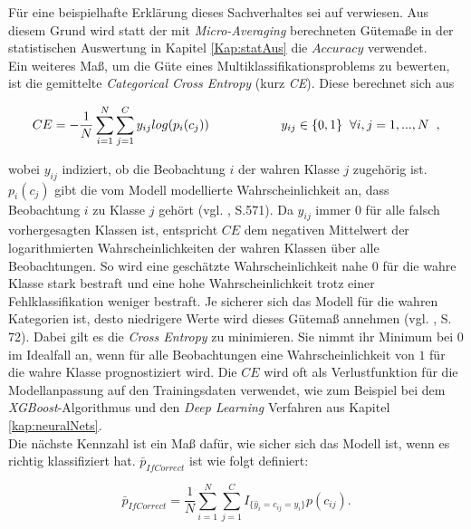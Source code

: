 \documentclass[a4paper,11pt]{article}
\begin{document}
Für eine beispielhafte Erklärung dieses Sachverhaltes sei auf \cite{towards1}
verwiesen. Aus diesem Grund wird statt der mit \textit{Micro-Averaging} berechneten Gütemaße in der statistischen Auswertung in Kapitel \ref{Kap:statAus} die $Accuracy$ verwendet.\\

Ein weiteres Maß, um die Güte eines Multiklassifikationsproblems zu bewerten, ist die gemittelte \textit{Categorical Cross Entropy} (kurz \textit{CE}). Diese berechnet sich aus

\[ CE = - \frac{1}{N}\sum_{i=1}^N \sum_{j = 1}^C y_{ij} log(p_i(c_j)) \hspace{2cm} y_{ij} \in \{0,1\} \hspace{0.2cm} \forall i, j = 1,...,N \hspace{0.2cm} ,\]

wobei $y_{ij}$ indiziert, ob die Beobachtung $i$ der wahren Klasse $j$ zugehörig ist. $p_i(c_j)$ gibt die vom Modell modellierte Wahrscheinlichkeit an, dass Beobachtung $i$ zu Klasse $j$ gehört (vgl. \cite{murphy}, S.571). Da $y_{ij}$ immer $0$ für alle falsch vorhergesagten Klassen ist, entspricht $CE$ dem negativen Mittelwert der logarithmierten Wahrscheinlichkeiten der wahren Klassen über alle Beobachtungen. So wird eine geschätzte Wahrscheinlichkeit nahe $0$ für die wahre Klasse stark bestraft und eine hohe Wahrscheinlichkeit trotz einer Fehlklassifikation weniger bestraft. Je sicherer sich das Modell für die wahren Kategorien ist, desto niedrigere Werte wird dieses Gütemaß annehmen (vgl. \cite{proMachine}, S. 72). 
Dabei gilt es die \textit{Cross Entropy} zu minimieren. Sie nimmt ihr Minimum bei $0$ im Idealfall an, wenn für alle Beobachtungen eine Wahrscheinlichkeit von $1$ für die wahre Klasse prognostiziert wird. Die $CE$ wird oft als Verlustfunktion für die Modellanpassung auf den Trainingsdaten verwendet, wie zum Beispiel bei dem \textit{XGBoost}-Algorithmus und den \textit{Deep Learning} Verfahren aus Kapitel \ref{kap:neuralNets}. \\
Die nächste Kennzahl ist ein Maß dafür, wie sicher sich das Modell ist, wenn es richtig klassifiziert hat. $\bar{p}_{IfCorrect}$ ist wie folgt definiert:

\[\bar{p}_{IfCorrect} = \frac{1}{N}\sum_{i=1}^N \sum_{j=1}^C I_{\{\hat{y}_i = c_{ij} = y_i\}} p(c_{ij}). \]
\end{document}
